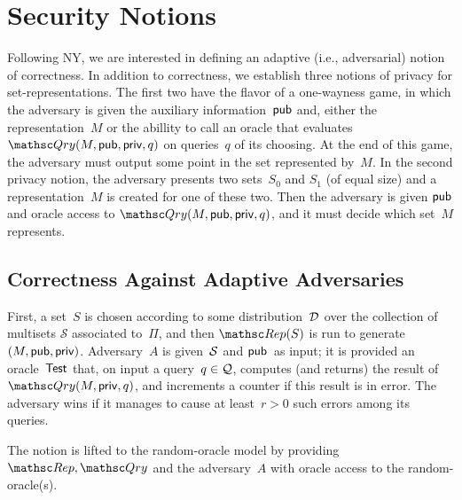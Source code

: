 \section{Security Notions}
\label{sec:security-notions}
Following NY, we are interested in defining an adaptive (i.e.,
adversarial) notion of correctness.   
In addition to correctness, we establish three notions of privacy for
set-representations. The first two have the flavor of a one-wayness game, in which the adversary is given the auxiliary information~${\sf pub}$ and, either the representation~$M$ or the abillity to call an oracle that evaluates $\Qry(M,\pubaux,\privaux,q)$ on queries~$q$ of its choosing.  At the end of this game, the adversary must output some point in the set represented by~$M$.  In the second privacy notion, the adversary presents two sets~$S_0$ and $S_1$ (of equal size) and a representation~$M$ is created for one of these two. Then the adversary is given ${\sf pub}$ and oracle access to $\Qry(M,\pubaux,\privaux,q)$, and it must decide which set~$M$ represents.

\subsection{Correctness Against Adaptive Adversaries}

First, a set~$S$ is chosen according to some
distribution~$\mathcal{D}_{}^{}$ over the collection of multisets
$\mathcal{S}$ associated to~$\Pi$, and then
$\Rep(S)$ is run to generate $(M,{\sf pub},{\sf priv})$.
Adversary~$A$ is given~${\cal S}$ and ${\sf pub}$~as input; it is
provided an oracle~$\mathsf{Test}$ that, on input a query~$q \in {\cal Q}$,
computes (and returns) the result of $\Qry(M,\privaux,q)$, and increments
a counter if this result is in error.  The adversary wins if it
manages to cause at least~$r>0$ such errors among its queries.

The notion is lifted to the random-oracle model by providing
$\Rep,\Qry$ and the adversary~$A$ with oracle access to the
random-oracle(s).



